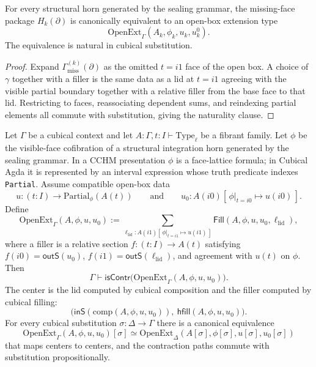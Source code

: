 \documentclass{lmcs}
\newcommand{\compop}{\mathrm{comp}}
\newcommand{\OpenExt}{\mathrm{OpenExt}}
\newcommand{\Partial}[2]{\mathrm{Partial}_{#1}(#2)}
\newcommand{\Type}{\mathrm{Type}}
\begin{document}
\begin{lem}
\label{lem:missing-face-openext}
For every structural horn generated by the sealing grammar, the missing-face
package $H_k(\partial)$ is canonically equivalent to an open-box extension
type
\[
  \OpenExt_\Gamma(A_k,\phi_k,u_k,u^0_k).
\]
The equivalence is natural in cubical substitution.
\end{lem}

\begin{proof}
Expand $\Gamma^{(k)}_{\mathrm{miss}}(\partial)$ as the omitted $t=i1$ face of
the open box. A choice of $\gamma$ together with a filler is the same data as a
lid at $t=i1$ agreeing with the visible partial boundary together with a
relative filler from the base face to that lid. Restricting to faces,
reassociating dependent sums, and reindexing partial elements all commute with
substitution, giving the naturality clause.
\end{proof}

\begin{thm}
\label{thm:actual-open-box-contractibility}
Let $\Gamma$ be a cubical context and let
$A:\Gamma,t:I\vdash\Type_\ell$ be a fibrant family. Let $\phi$ be the
visible-face cofibration of a structural integration horn generated by the
sealing grammar. In a CCHM presentation $\phi$ is a face-lattice formula; in
Cubical Agda it is represented by an interval expression whose truth predicate
indexes \texttt{Partial}. Assume compatible open-box data
\[
  u:(t:I)\to \Partial{\phi}{A(t)}
  \qquad\text{and}\qquad
  u_0:A(i0)[\,\phi|_{t=i0}\mapsto u(i0)\,].
\]
Define
\[
  \OpenExt_\Gamma(A,\phi,u,u_0)
  :=
  \sum_{\ell_{\mathrm{lid}}:A(i1)[\,\phi|_{t=i1}\mapsto u(i1)\,]}
    \mathsf{Fill}(A,\phi,u,u_0,\ell_{\mathrm{lid}}),
\]
where a filler is a relative section $f:(t:I)\to A(t)$ satisfying
$f(i0)=\mathsf{outS}(u_0)$, $f(i1)=\mathsf{outS}(\ell_{\mathrm{lid}})$, and agreement with
$u(t)$ on $\phi$. Then
\[
  \Gamma\vdash \mathsf{isContr}\bigl(\OpenExt_\Gamma(A,\phi,u,u_0)\bigr).
\]
The center is the lid computed by cubical composition and the filler computed
by cubical filling:
\[
  \bigl(\mathsf{inS}(\compop(A,\phi,u,u_0)),\ \mathsf{hfill}(A,\phi,u,u_0)\bigr).
\]
For every cubical substitution $\sigma:\Delta\to\Gamma$ there is a canonical
equivalence
\[
  \OpenExt_\Gamma(A,\phi,u,u_0)[\sigma]\simeq
  \OpenExt_\Delta(A[\sigma],\phi[\sigma],u[\sigma],u_0[\sigma])
\]
that maps centers to centers, and the contraction paths commute with
substitution propositionally.
\end{thm}
\end{document}
